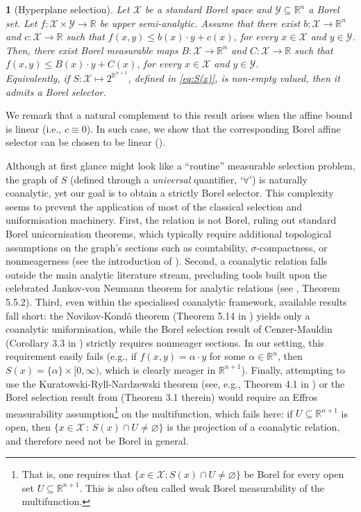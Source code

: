 \documentclass[10pt, a4paper]{article}
\newcommand{\R}{\mathbb R}
\newcommand{\X}{\mathcal X}
\newcommand{\Y}{\mathcal Y}
\newcommand{\reptile}{}
\newtheorem*{repinner}{\reptile}
\newenvironment{refthm}[1]{%
  \renewcommand{\reptile}{Theorem \ref{#1}}%
  \begin{repinner}
}{%
  \end{repinner}
}
\begin{document}
\begin{refthm}{thm:main}[Hyperplane selection]
Let $\X$ be a standard Borel space and $\Y\subseteq\R^n$ a Borel set. Let $f:\X\times \Y\to\R$ be upper semi-analytic. Assume that there exist  $b:\X\to\R^n$ and $c:\X\to\R$ such that $f(x,y)\leq b(x)\cdot y  +c(x)$, for every $x\in\X$ and $y\in \Y$. Then, there exist Borel measurable maps $B:\X\to\R^n$ and $C:\X\to\R$ such that
    $f(x,y)\leq B(x)\cdot y  +C(x)$, for every $x\in\X$ and $y\in\Y$.\\
Equivalently, if $S:\X\mapsto 2^{\R^{n+1}}$, defined in \eqref{eq:S(x)}, is non-empty valued, then it admits a Borel selector.
\end{refthm}

We remark that a natural complement to this result arises when the affine bound is linear (i.e., $c \equiv 0$). In such case, we show that the corresponding Borel affine selector can be chosen to be linear ().

Although at  first glance  might look like a ``routine'' measurable selection problem, the graph of $S$ (defined through a \emph{universal} quantifier, `$\forall$') is naturally coanalytic, yet our goal is to obtain a strictly Borel selector. This complexity seems to prevent the application of most of the classical selection and uniformisation machinery. First, the relation is not Borel, ruling out standard Borel unicornisation theorems, which typically require additional topological assumptions on the graph's sections such as countability, $\sigma$-compactness, or nonmeagerness (see the introduction of \cite{kechris2025invariant}). Second, a coanalytic relation falls outside the main analytic literature stream, precluding tools built upon the celebrated Jankov-von Neumann theorem for analytic relations (see \cite{srivastava1998course}, Theorem 5.5.2). Third, even within the specialised coanalytic framework, available results fall short: the Novikov-Kond\^o theorem (Theorem 5.14 in \cite{srivastava1998course}) yields only a coanalytic uniformisation, while the Borel selection result of Cenzer-Mauldin (Corollary 3.3 in \cite{burgess1981careful}) strictly requires nonmeager sections. In our setting, this requirement easily fails (e.g., if $f(x,y)=\alpha\cdot y$ for some $\alpha\in\R^n$, then $S(x) = \{\alpha\}\times [0,\infty)$, which is clearly meager in $\R^{n+1}$). Finally, attempting to use the Kuratowski-Ryll-Nardzewski theorem (see, e.g., Theorem 4.1 in \cite{wagner1977survey}) or the Borel selection result from \cite{burgess1981careful} (Theorem 3.1 therein) would require an Effros measurability assumption\footnote{That is, one requires that $\{x\in\X:S(x)\cap U\neq\varnothing\}$ be Borel for every open set $U\subseteq\R^{n+1}$. This is also often called weak Borel measurability of the multifunction.} on the multifunction, which fails here: if $U\subseteq\mathbb R^{n+1}$ is open, then $\{x\in\X\,:\,S(x)\cap U\neq\varnothing\}$ is the projection of a coanalytic relation, and therefore need not be Borel in general.
\end{document}
